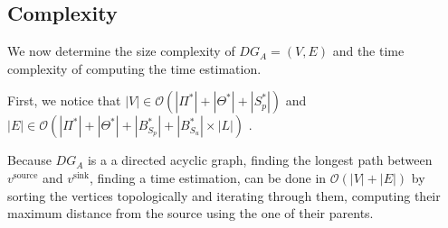 





\subsection{Complexity}

We now determine the size complexity of $DG_A=(V,E)$ and the time
complexity of computing the time estimation.

First, we notice that
$|V| \in \mathcal{O}\left(\left|\Pi^*\right|+\left|\Theta^*\right|+\left|S_p^*\right|\right)$
and
$|E| \in \mathcal{O}\left(\left|\Pi^*\right|+\left|\Theta^*\right|+\left|B_{S_p}^*\right|+\left|B_{S_u}^*\right|\times\left|L\right|\right)$
.

Because $DG_A$ is a a directed acyclic graph, finding the longest path
between $v^\text{source}$ and $v^\text{sink}$, \ie finding a time estimation,
can be done in $\mathcal{O}(|V|+|E|)$ by sorting the
vertices topologically and iterating through them, computing their maximum
distance from the source using the one of their parents.

